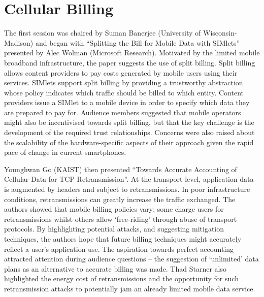 \section{Cellular Billing}
\label{sec:cellbilling}

The first session was chaired by Suman Banerjee (University of Wisconsin-Madison)
and began with ``Splitting the Bill for Mobile Data with SIMlets'' presented by 
Alec Wolman (Microsoft Research). Motivated by the limited mobile broadband 
infrastructure, the paper suggests the use of split billing. Split billing allows 
content providers to pay costs generated by mobile users using their services.
SIMlets support split billing by providing a trustworthy abstraction whose policy indicates which traffic should be billed to 
which entity. Content providers issue a SIMlet to a mobile device in order to 
specify which data they are prepared to pay for.
Audience members suggested that mobile operators might also be incentivised 
towards split billing, but that the key challenge is the development of the 
required trust relationships. Concerns were also raised about the scalability of the hardware-specific aspects of their approach given the rapid pace of change in
current smartphones.

Younghwan Go (KAIST) then presented ``Towards Accurate Accounting of Cellular 
Data for TCP Retransmission''. At the transport level, application data
is augmented by headers and subject to retransmissions. In 
poor infrastructure conditions, retransmissions can greatly increase the traffic 
exchanged. The authors showed that mobile billing policies vary; some charge users 
for retransmissions whilst others allow `free-riding' through abuse of transport 
protocols. By highlighting potential attacks, and suggesting mitigation 
techniques, the authors hope that future billing techniques might accurately 
reflect a user's application use.
The aspiration towards perfect accounting attracted attention during audience
questions -- the suggestion of `unlimited' data plans as an
alternative to accurate billing was made. Thad Starner also highlighted the 
energy cost of retransmissions %
and the opportunity for such retransmission attacks to potentially jam an already 
limited mobile data service.
